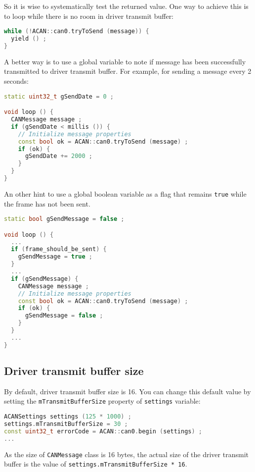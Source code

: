 \documentclass[10pt, a4paper, obeyspaces, openany]{extarticle}
\newcommand \subsectionLabel[2]{\subsection{#1}\label{subsec:#2}}
\begin{document}
So it is wise to systematically test the returned value. One way to achieve this is to loop while there is no room in driver transmit buffer:
{ \small
  \begin{lstlisting}[language=c++]
while (!ACAN::can0.tryToSend (message)) {
  yield () ;
}
  \end{lstlisting}
}

A better way is to use a global variable to note if  message has been successfully transmitted to driver transmit buffer. For example, for sending a message every 2 seconds: 

{ \small
  \begin{lstlisting}[language=c++]
static uint32_t gSendDate = 0 ;

void loop () {
  CANMessage message ;
  if (gSendDate < millis ()) {
    // Initialize message properties
    const bool ok = ACAN::can0.tryToSend (message) ;
    if (ok) {
      gSendDate += 2000 ;
    }
  }
}
  \end{lstlisting}
}

An other hint to use a global boolean variable as a flag that remains \texttt{true} while the frame has not been sent.

{ \small
  \begin{lstlisting}[language=c++]
static bool gSendMessage = false ;

void loop () {
  ...
  if (frame_should_be_sent) {
    gSendMessage = true ;
  }
  ...
  if (gSendMessage) {
    CANMessage message ;
    // Initialize message properties
    const bool ok = ACAN::can0.tryToSend (message) ;
    if (ok) {
      gSendMessage = false ;
    }
  }
  ...
}
  \end{lstlisting}
}


\subsectionLabel{Driver transmit buffer size}{driverTransmitBufferSize}

By default, driver transmit buffer size is 16. You can change this default value by setting the \texttt{mTransmitBufferSize} property of \texttt{settings} variable:

{ \small\begin{lstlisting}[language=c++]
ACANSettings settings (125 * 1000) ;
settings.mTransmitBufferSize = 30 ;
const uint32_t errorCode = ACAN::can0.begin (settings) ;
...
\end{lstlisting}}

As the size of \texttt{CANMessage} class is 16 bytes, the actual size of the driver transmit buffer is the value of \texttt{settings.mTransmitBufferSize * 16}.
\end{document}
